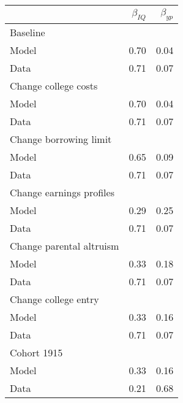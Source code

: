 \begin{tabular}{lrr}
\hline
  & $\beta_{IQ}$  & $\beta_{yp}$  \\ 
\hline
Baseline &   &   \\ 
Model & 0.70  & 0.04  \\ 
Data & 0.71  & 0.07  \\ 
Change college costs &   &   \\ 
Model & 0.70  & 0.04  \\ 
Data & 0.71  & 0.07  \\ 
Change borrowing limit &   &   \\ 
Model & 0.65  & 0.09  \\ 
Data & 0.71  & 0.07  \\ 
Change earnings profiles &   &   \\ 
Model & 0.29  & 0.25  \\ 
Data & 0.71  & 0.07  \\ 
Change parental altruism &   &   \\ 
Model & 0.33  & 0.18  \\ 
Data & 0.71  & 0.07  \\ 
Change college entry &   &   \\ 
Model & 0.33  & 0.16  \\ 
Data & 0.71  & 0.07  \\ 
Cohort 1915 &   &   \\ 
Model & 0.33  & 0.16  \\ 
Data & 0.21  & 0.68  \\ 
\hline
\end{tabular}%
